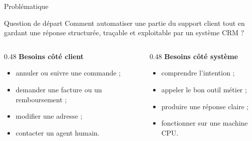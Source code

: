 \documentclass[aspectratio=169,10pt]{beamer}
\begin{document}
\begin{frame}{Problématique}
    \begin{block}{Question de départ}
        Comment automatiser une partie du support client tout en gardant une réponse structurée, traçable et exploitable par un système CRM ?
    \end{block}

    \vspace{0.2cm}
    \begin{columns}[T]
        \begin{column}{0.48\textwidth}
            \textbf{Besoins côté client}
            \begin{itemize}
                \item annuler ou suivre une commande ;
                \item demander une facture ou un remboursement ;
                \item modifier une adresse ;
                \item contacter un agent humain.
            \end{itemize}
        \end{column}
        \begin{column}{0.48\textwidth}
            \textbf{Besoins côté système}
            \begin{itemize}
                \item comprendre l'intention ;
                \item appeler le bon outil métier ;
                \item produire une réponse claire ;
                \item fonctionner sur une machine CPU.
            \end{itemize}
        \end{column}
    \end{columns}
\end{frame}
\end{document}
